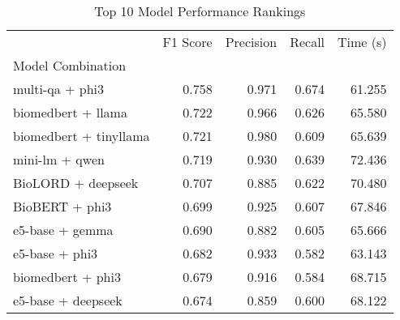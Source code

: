 \begin{table}
\caption{Top 10 Model Performance Rankings}
\label{tab:model_rankings}
\begin{tabular}{lrrrr}
\toprule
 & F1 Score & Precision & Recall & Time (s) \\
Model Combination &  &  &  &  \\
\midrule
multi-qa + phi3 & 0.758 & 0.971 & 0.674 & 61.255 \\
biomedbert + llama & 0.722 & 0.966 & 0.626 & 65.580 \\
biomedbert + tinyllama & 0.721 & 0.980 & 0.609 & 65.639 \\
mini-lm + qwen & 0.719 & 0.930 & 0.639 & 72.436 \\
BioLORD + deepseek & 0.707 & 0.885 & 0.622 & 70.480 \\
BioBERT + phi3 & 0.699 & 0.925 & 0.607 & 67.846 \\
e5-base + gemma & 0.690 & 0.882 & 0.605 & 65.666 \\
e5-base + phi3 & 0.682 & 0.933 & 0.582 & 63.143 \\
biomedbert + phi3 & 0.679 & 0.916 & 0.584 & 68.715 \\
e5-base + deepseek & 0.674 & 0.859 & 0.600 & 68.122 \\
\bottomrule
\end{tabular}
\end{table}
